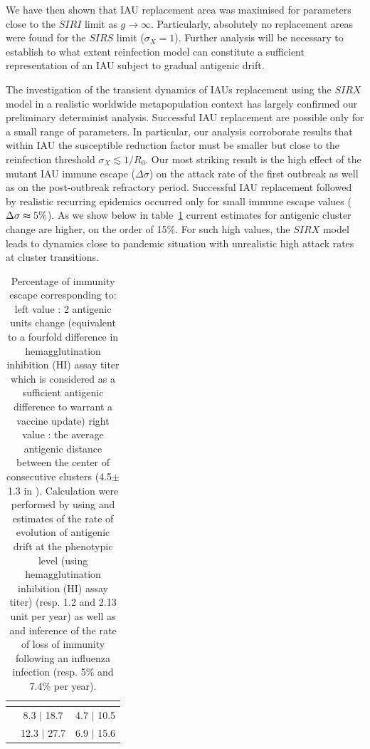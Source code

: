 We have then shown that IAU replacement area was maximised for
parameters close to the $SIRI$ limit as $g \to \infty$. Particularly,
absolutely no replacement areas were found for the $SIRS$ limit
($\sigma_X=1$). Further analysis will be necessary to establish to
what extent \citep{Goekaydin2007} reinfection model can constitute a
sufficient representation of an IAU subject to gradual antigenic
drift.

The investigation of the transient dynamics of IAUs replacement using
the $SIRX$ model in a realistic worldwide metapopulation context has
largely confirmed our preliminary determinist analysis.  Successful
IAU replacement are possible only for a small range of parameters. In
particular, our analysis corroborate \citep{Goekaydin2007} results
that within IAU the susceptible reduction factor must be smaller but
close to the reinfection threshold $\sigma_{X}\lesssim 1/R_{0}$. Our
most striking result is the high effect of the mutant IAU immune
escape ($\Delta\sigma$) on the attack rate of the first outbreak as
well as on the post-outbreak refractory period. Successful IAU
replacement followed by realistic recurring epidemics occurred only
for small immune escape values ($\Delta\sigma\thickapprox 5\%$). As we
show below in table~\ref{tab:drift_values} current estimates for
antigenic cluster change are higher, on the order of 15\%. For such
high values, the $SIRX$ model leads to dynamics close to pandemic
situation with unrealistic high attack rates at cluster transitions.

\begin{table}[h!tb]
  \centering
  \begin{tabular}{|c|c|c|}
    \hline
    & \citet{Smith2004} & \citet{Russell2008} \\
    \hline
    \citet{Pease1987} & 8.3 $|$ 18.7 & 4.7 $|$ 10.5 \\
    \hline
    \citet{Finkenstaedt2005} & 12.3 $|$ 27.7 & 6.9 $|$ 15.6 \\
    \hline
  \end{tabular}
  \caption{Percentage of immunity escape corresponding to:
    left value : 2 antigenic units change (equivalent to a fourfold difference in
    hemagglutination inhibition (HI) assay titer which is considered
    as a sufficient antigenic difference to warrant a vaccine update)
    right value : the average antigenic distance between the center of
    consecutive clusters (4.5$\pm$1.3 in \citet{Smith2004}).
    Calculation were performed by  using \citet{Smith2004}
    and \citet{Russell2008} estimates of the rate of evolution of
    antigenic drift at the phenotypic level (using hemagglutination
    inhibition (HI) assay titer) (resp. 1.2  and 2.13 unit per year) as well as \citet{Pease1987} and
    \citet{Finkenstaedt2005} inference of the rate of loss of immunity
    following an influenza infection (resp. 5\% and 7.4\% per year).}
  \label{tab:drift_values}
\end{table}


